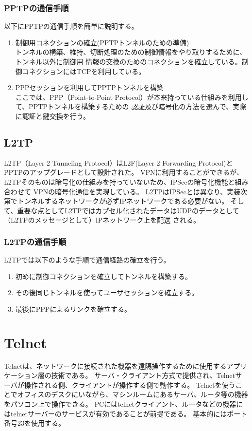 \documentclass[12pt,a4paper,titlepage]{jreport}
\begin{document}
\subsubsection*{PPTPの通信手順}
以下にPPTPの通信手順を簡単に説明する。
\begin{enumerate}
    \item 制御用コネクションの確立(PPTPトンネルのための準備)\mbox{}\\
    トンネルの構築、維持、切断処理のための制御情報をやり取りするために、トンネル以外に制御用
    情報の交換のためのコネクションを確立している。制御コネクションにはTCPを利用している。
    \item PPPセッションを利用してPPTPトンネルを構築\mbox{}\\
    ここでは、PPP（Point-to-Point Protocol）が本来持っている仕組みを利用して、PPTPトンネルを構築するための
    認証及び暗号化の方法を選んで、実際に認証と鍵交換を行う。
\end{enumerate}

\subsection{L2TP}
L2TP（Layer 2 Tunneling Protocol）\cite{RFC2661}はL2F(Layer 2 Forwarding Protocol)とPPTPのアップグレードとして設計された。
VPNに利用することができるが、L2TPそのものは暗号化の仕組みを持っていないため、IPSecの暗号化機能と組み合わせて
VPNの暗号化通信を実現している。
L2TPはIPSecとは異なり、実装次第でトンネルするネットワークが必ずIPネットワークである必要がない。
そして、重要な点としてL2TPではカプセル化されたデータはUDPのデータとして（L2TPのメッセージとして）IPネットワーク上を配送
される。
\subsubsection*{L2TPの通信手順}
L2TPでは以下のような手順で通信経路の確立を行う。
\begin{enumerate}
    \item 初めに制御コネクションを確立してトンネルを構築する。
    \item その後同じトンネルを使ってユーザセッションを確立する。
    \item 最後にPPPによるリンクを確立する。
\end{enumerate}


\section{Telnet}
Telnetは、ネットワークに接続された機器を遠隔操作するために使用するアプリケーション層の技術である。
サーバ・クライアント方式で提供され、Telnetサーバが操作される側、クライアントが操作する側で動作する。
Telnetを使うことでオフィスのデスクにいながら、マシンルームにあるサーバ、ルータ等の機器をパソコン上で操作できる。
PCにはtelnetクライアント、ルータなどの機器にはtelnetサーバーのサービスが有効であることが前提である。
基本的にはポート番号23を使用する。
\end{document}
